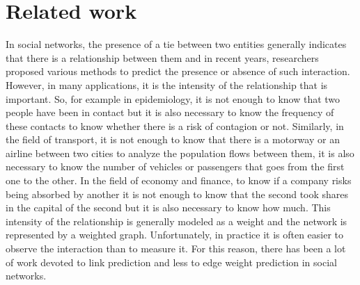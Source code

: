 \section{Related work}
\label{sec:rl}

In social networks, the presence of a tie between two entities generally indicates that there is a relationship between them and in recent years, researchers proposed various methods to predict the presence or absence of such interaction. However, in many applications, it is the intensity of the relationship that is important. So, for example in epidemiology, it is not enough to know that two people have been in contact but it is also necessary to know the frequency of these contacts to know whether there is a risk of contagion or not. Similarly, in the field of transport, it is not enough to know that there is a motorway or an airline between two cities to analyze the population flows between them, it is also necessary to know the number of vehicles or passengers that goes from the first one to the other. In the field of economy and finance, to know if a company risks being absorbed by another it is not enough to know that the second took shares in the capital of the second but it is also necessary to know how much. This intensity of the relationship is generally modeled as a weight and the network is represented by a weighted graph. Unfortunately, in practice it is often easier to observe the interaction than to measure it. For this reason, there has been a lot of work devoted to link prediction \cite{Liben2007, Zaki2011,  Martinez2016}  %
and less to edge weight prediction in social networks.


